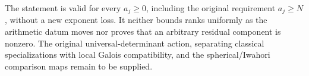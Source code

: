 The statement is valid for every $a_j\geq0$, including the
original requirement $a_j\geq N$, without a new exponent loss.
It neither bounds ranks uniformly as the arithmetic datum moves
nor proves that an arbitrary residual component is nonzero.
The original universal-determinant action, separating classical
specializations with local Galois compatibility, and the
spherical/Iwahori comparison maps remain to be supplied.
